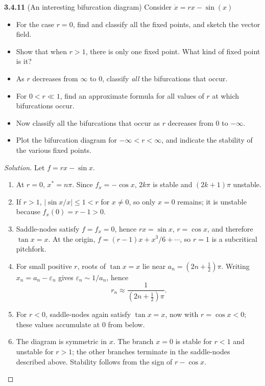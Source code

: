 \documentclass[10pt]{amsart}
\newenvironment{solution}
{\begin{proof}[Solution]}
{\end{proof}}
\begin{document}
\begin{onehalfspace}
        \noindent\textbf{3.4.11} (An interesting bifurcation diagram) Consider $\dot{x} = rx - \sin{(x)}$
        \begin{itemize}
            \item[a)] For the case $r = 0$, find and classify all the fixed points, and sketch the vector field.
            \item[b)] Show that when $r > 1$, there is only one fixed point.
            What kind of fixed point is it?
            \item[c)] As $r$ decreases from $\infty$ to $0$, classify \emph{all} the bifurcations that occur.
            \item[d)] For $0 < r \ll 1$, find an approximate formula for all values of $r$ at which bifurcations occur.
            \item[e)] Now classify all the bifurcations that occur as $r$ decreases from $0$ to $-\infty$.
            \item[f)] Plot the bifurcation diagram for $-\infty < r < \infty$, and indicate the stability of the various
            fixed points.
        \end{itemize}

        \begin{solution}
Let $f=rx-\sin x$.
\begin{enumerate}[label=(\alph*)]
\item At $r=0$, $x^*=n\pi$. Since $f_x=-\cos x$, $2k\pi$ is stable and $(2k+1)\pi$ unstable.
\item If $r>1$, $|\sin x/x|\le1<r$ for $x\ne0$, so only $x=0$ remains; it is unstable because $f_x(0)=r-1>0$.
\item Saddle-nodes satisfy $f=f_x=0$, hence $rx=\sin x$, $r=\cos x$, and therefore $\tan x=x$. At the origin, $f=(r-1)x+x^3/6+\cdots$, so $r=1$ is a subcritical pitchfork.
\item For small positive $r$, roots of $\tan x=x$ lie near $a_n=(2n+\tfrac12)\pi$. Writing $x_n=a_n-\varepsilon_n$ gives $\varepsilon_n\sim1/a_n$, hence
\[r_n\approx\frac{1}{(2n+\tfrac12)\pi}.\]
\item For $r<0$, saddle-nodes again satisfy $\tan x=x$, now with $r=\cos x<0$; these values accumulate at $0$ from below.
\item The diagram is symmetric in $x$. The branch $x=0$ is stable for $r<1$ and unstable for $r>1$; the other branches terminate in the saddle-nodes described above. Stability follows from the sign of $r-\cos x$.
\end{enumerate}


\end{solution}
\end{onehalfspace}
\end{document}
